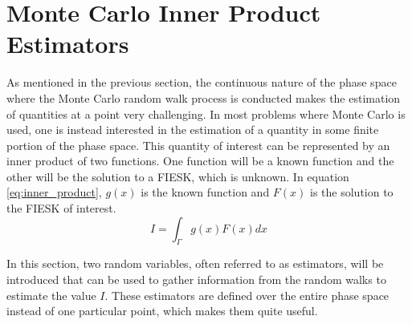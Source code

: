 \section{Monte Carlo Inner Product Estimators}
\label{sec:mc_int_eqn_estimators}
As mentioned in the previous section, the continuous nature of the phase space
where the Monte Carlo random walk process is conducted makes the estimation of
quantities at a point very challenging. In most problems where Monte Carlo is 
used, one is instead interested in the estimation of a quantity in some finite 
portion of the phase space. This quantity of interest can be represented by
an inner product of two functions. One function will be a known function and
the other will be the solution to a FIESK, which is unknown. In equation 
\ref{eq:inner_product}, $g(x)$ is the known function and $F(x)$ is the solution 
to the FIESK of interest.
\begin{equation}
  I = \int_{\Gamma} g(x)F(x)dx
  \label{eq:inner_product}
\end{equation}

In this section, two random variables, often referred to as estimators, will 
be introduced that can be used to gather information from the random walks to 
estimate the value $I$. These estimators are defined over the entire phase 
space instead of one particular point, which makes them quite useful. 

